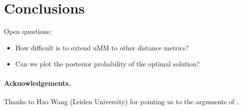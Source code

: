 \documentclass[runningheads]{llncs}
\begin{document}
\section{Conclusions}

Open questions:
\begin{itemize}
\item How difficult is to extend uMM to other distance metrics?
\item Can we plot the posterior probability of the optimal solution?
\end{itemize}

\paragraph*{Acknowledgements.}

Thanks to Hao Wang (Leiden University) for pointing us to the arguments of
\citet{EriPeaGar2019scalable}.




\renewcommand{\doi}[1]{doi:\hspace{.16667em plus .08333em}\discretionary{}{}{}\href{https://doi.org/#1}{\urlstyle{rm}\nolinkurl{#1}}}


\end{document}

